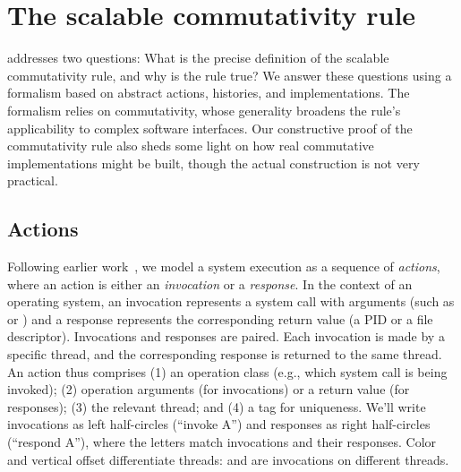 \section{The scalable commutativity rule}
\label{sec:rule}


 addresses two questions: What is the precise
definition of the scalable commutativity rule, and why is the rule true?
%
We answer these questions using a formalism based on abstract actions,
histories,
and implementations.
%
The formalism relies on \SIM commutativity, whose generality broadens
the rule's applicability to complex software interfaces.
%
Our constructive proof of the commutativity rule
also sheds some light on how real commutative implementations might be
built, though the actual construction is not very practical.



\subsection{Actions}

Following earlier work~\cite{herlihy:linearizability}, 
we model a system execution
as a sequence of \emph{actions}, where an action is either an
\emph{invocation} or a \emph{response}.
%
In the context of an operating system, an invocation represents a system
call with arguments (such as  or ) and a
response represents the corresponding return value (a PID or a file
descriptor).
%
Invocations and responses are paired. Each invocation is made by a
specific thread, and the corresponding response is returned to the same
thread.
%
An action thus comprises (1) an operation class (e.g., which system
call is being invoked); (2) operation arguments (for invocations) or
a return value (for responses); (3) the relevant thread;
and (4) a tag for uniqueness.
%
We'll write invocations as left half-circles 
(``invoke A'') and responses as right half-circles
 (``respond A''), where the letters match
invocations and their responses.
%
Color and vertical offset differentiate threads:
 and  are invocations on
different threads.

\def\historyexample{%
\scpi{A}{1}
\scpi{B}{3}
\scpi{C}{2}
\scpr{A}{1}
\scpr{C}{2}
\scpr{B}{3}
\scpi{D}{1}
\scpr{D}{1}
\scpi{E}{3}
\scpr{E}{3}
\scpi{F}{2}
\scpi{G}{3}
\scpi{H}{1}
\scpr{F}{2}
\scpr{H}{1}
\scpr{G}{3}}

